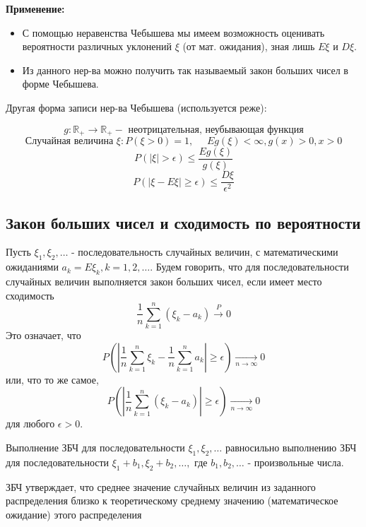 \begin{enumerate}
	\noindent \textbf{Применение:}
	
	\begin{itemize}
		\item С помощью неравенства Чебышева мы имеем возможность оценивать вероятности различных уклонений $\xi$ (от мат. ожидания), зная лишь $E\xi$ и $D\xi$.
		\item Из данного нер-ва можно получить так называемый закон больших чисел в форме Чебышева.
	\end{itemize}
	
	\noindent Другая форма записи нер-ва Чебышева (используется реже):
	
	\[ g: \mathbb{R}_{+} \to \mathbb{R}_{+} - \text{ неотрицательная, неубывающая функция} \]
	\[ \text{Случайная величина } \xi : P(\xi > 0) = 1, ~~~~~~ Eg(\xi) < \infty, g(x) > 0, x > 0 \]
	\[ P (|\xi| > \epsilon) \le \frac{Eg(\xi)}{g(\xi)} \]
	\[ P( |\xi - E\xi| \ge \epsilon ) \le \frac{D\xi}{\epsilon^2} \]
\end{enumerate}

\subsection{Закон больших чисел и сходимость по вероятности}

\begin{definition}
	Пусть $\xi_1, \xi_2, \dots$ - последовательность случайных величин, с математическими ожиданиями $a_k = E\xi_k, k = 1, 2, \dots$. Будем говорить, что для последовательности случайных величин выполняется закон больших чисел, если имеет место сходимость
	\[ \frac{1}{n} \sum_{k=1}^{n} (\xi_k - a_k) \overset{P}{\to} 0 \]
	Это означает, что
	\[ P \left( \left| \frac{1}{n} \sum_{k=1}^{n} \xi_k - \frac{1}{n} \sum_{k=1}^{n} a_k \right| \ge \epsilon \right) \underset{n \to \infty}{\to} 0 \]
	или, что то же самое,
	\[ P \left( \left| \frac{1}{n} \sum_{k=1}^{n} (\xi_k - a_k) \right| \ge \epsilon \right) \underset{n \to \infty}{\to} 0 \]
	для любого $\epsilon > 0$.
\end{definition}
\begin{remark}
	Выполнение ЗБЧ для последовательности $\xi_1, \xi_2, \dots$ равносильно выполнению ЗБЧ для последовательности $\xi_1 + b_1, \xi_2 + b_2, \dots,$ где $b_1, b_2, \dots$ - произвольные числа.
\end{remark}

ЗБЧ утверждает, что среднее значение случайных величин из заданного распределения близко к теоретическому среднему значению (математическое ожидание) этого распределения

